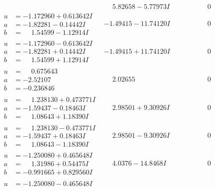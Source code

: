 \documentclass[1p]{elsarticle_modified}
\theoremstyle{definition}
\begin{document}
$$\begin{array}{c|c|c}
 & \phantom{-}5.82658 - 5.77973 I & \phantom{-0.000000 } 0 \\ \hline\begin{aligned}
u &= -1.172960 + 0.613642 I \\
a &= -1.82281 - 0.14442 I \\
b &= \phantom{-}1.54599 - 1.12914 I\end{aligned}
 & -1.49415 - 11.74120 I & \phantom{-0.000000 } 0 \\ \hline\begin{aligned}
u &= -1.172960 - 0.613642 I \\
a &= -1.82281 + 0.14442 I \\
b &= \phantom{-}1.54599 + 1.12914 I\end{aligned}
 & -1.49415 + 11.74120 I & \phantom{-0.000000 } 0 \\ \hline\begin{aligned}
u &= \phantom{-}0.675643\phantom{ +0.000000I} \\
a &= -2.52107\phantom{ +0.000000I} \\
b &= -0.236846\phantom{ +0.000000I}\end{aligned}
 & \phantom{-}2.02655\phantom{ +0.000000I} & \phantom{-0.000000 } 0 \\ \hline\begin{aligned}
u &= \phantom{-}1.238130 + 0.473771 I \\
a &= -1.59437 - 0.18463 I \\
b &= \phantom{-}1.08643 + 1.18390 I\end{aligned}
 & \phantom{-}2.98501 + 9.30926 I & \phantom{-0.000000 } 0 \\ \hline\begin{aligned}
u &= \phantom{-}1.238130 - 0.473771 I \\
a &= -1.59437 + 0.18463 I \\
b &= \phantom{-}1.08643 - 1.18390 I\end{aligned}
 & \phantom{-}2.98501 - 9.30926 I & \phantom{-0.000000 } 0 \\ \hline\begin{aligned}
u &= -1.250080 + 0.465648 I \\
a &= \phantom{-}1.31986 + 0.54475 I \\
b &= -0.991665 + 0.829560 I\end{aligned}
 & \phantom{-}4.0376 - 14.8468 I & \phantom{-0.000000 } 0 \\ \hline\begin{aligned}
u &= -1.250080 - 0.465648 I \\

\end{aligned}
\end{array}$$
\end{document}
